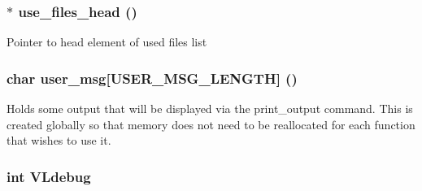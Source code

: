\subsubsection{$\ast$ {\bf use\_\-files\_\-head} ()}\label{parse_8c_a1}


Pointer to head element of used files list 
\subsubsection{\setlength{\rightskip}{0pt plus 5cm}char {\bf user\_\-msg}[USER\_\-MSG\_\-LENGTH] ()}\label{parse_8c_a4}


Holds some output that will be displayed via the print\_\-output command. This is created globally so that memory does not need to be reallocated for each function that wishes to use it. 
\subsubsection{\setlength{\rightskip}{0pt plus 5cm}int {\bf VLdebug}}\label{parse_8c_a0}


